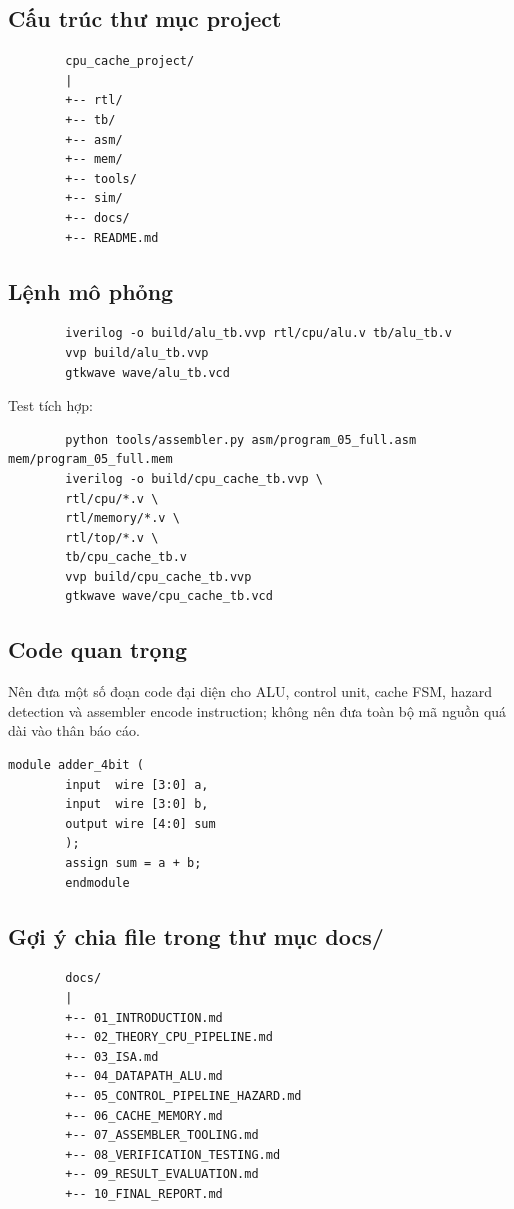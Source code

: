 \documentclass[11pt,a4paper]{article}
\theoremstyle{definition}
\theoremstyle{remark}
\begin{document}
	\subsection{Cấu trúc thư mục project}
	\begin{verbatim}
		cpu_cache_project/
		|
		+-- rtl/
		+-- tb/
		+-- asm/
		+-- mem/
		+-- tools/
		+-- sim/
		+-- docs/
		+-- README.md
	\end{verbatim}
	
	\subsection{Lệnh mô phỏng}
	\begin{verbatim}
		iverilog -o build/alu_tb.vvp rtl/cpu/alu.v tb/alu_tb.v
		vvp build/alu_tb.vvp
		gtkwave wave/alu_tb.vcd
	\end{verbatim}
	
	Test tích hợp:
	\begin{verbatim}
		python tools/assembler.py asm/program_05_full.asm mem/program_05_full.mem
		iverilog -o build/cpu_cache_tb.vvp \
		rtl/cpu/*.v \
		rtl/memory/*.v \
		rtl/top/*.v \
		tb/cpu_cache_tb.v
		vvp build/cpu_cache_tb.vvp
		gtkwave wave/cpu_cache_tb.vcd
	\end{verbatim}
	
	\subsection{Code quan trọng}
	Nên đưa một số đoạn code đại diện cho ALU, control unit, cache FSM, hazard detection và assembler encode instruction; không nên đưa toàn bộ mã nguồn quá dài vào thân báo cáo.
	
	\begin{lstlisting}[caption={Example: 4-bit Verilog adder},label={lst:verilog-adder}]
		module adder_4bit (
		input  wire [3:0] a,
		input  wire [3:0] b,
		output wire [4:0] sum
		);
		assign sum = a + b;
		endmodule
	\end{lstlisting}
	
	\subsection{Gợi ý chia file trong thư mục docs/}
	\begin{verbatim}
		docs/
		|
		+-- 01_INTRODUCTION.md
		+-- 02_THEORY_CPU_PIPELINE.md
		+-- 03_ISA.md
		+-- 04_DATAPATH_ALU.md
		+-- 05_CONTROL_PIPELINE_HAZARD.md
		+-- 06_CACHE_MEMORY.md
		+-- 07_ASSEMBLER_TOOLING.md
		+-- 08_VERIFICATION_TESTING.md
		+-- 09_RESULT_EVALUATION.md
		+-- 10_FINAL_REPORT.md
	\end{verbatim}
	
\end{document}
